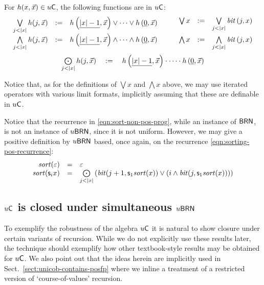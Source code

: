 \documentclass{lmcs}
\begin{document}
\begin{remark}
	\label{rmk:iter-fns}
For 
	$h(x,\vec x) \in u \mathsf{C}$, the following functions are in $u \mathsf{C}$:
	\[
	\begin{array}{c}
	\begin{array}{rcl}
	\bigvee\limits_{j <|x|} h(j,\vec x) & \dfn & h\left( \unary{|x|-1}, \vec x \right)  \vee \cdots \vee h\left(\unary{0}, \vec x\right) \\
	\bigwedge\limits_{j<|x|} h(j,\vec x) & \dfn & h\left( \unary{|x|-1}, \vec x \right)  \wedge \cdots \wedge h\left(\unary{0}, \vec x\right) 
	\end{array}
	\qquad
	\begin{array}{rcl}
	\bigvee x & \dfn & \bigvee\limits_{j < |x|} \bit\left( j, x\right) \\
	\noalign{\medskip}
	\bigwedge x & \dfn & \bigwedge\limits_{j < |x|} \bit\left( j, x\right)
	\end{array}
\\
\noalign{\medskip}
	\bigodot\limits_{j <|x|} h(j,\vec x) \quad  \dfn  \quad h\left( \unary{|x|-1}, \vec x \right)  \cdot \cdots \cdot h\left(\unary{0}, \vec x\right)
	\end{array}
	\]
	
	
	\noindent
	Notice that, as for the definitions of $\bigvee x$ and $\bigwedge x$ above, we may use iterated operators with various limit formats, implicitly assuming that these are definable in $u \mathsf{C}$.
\end{remark}

\begin{example}
	Notice that the recurrence in \eqref{eqn:sort-non-pos-prog}, while an instance of $\mathsf{BRN}$, is not an instance of $u\mathsf{BRN}$, since it is not uniform. 
	However, we may give a positive definition by $u\mathsf{BRN}$ based, once again, on the recurrence \eqref{eqn:sorting-pos-recurrence}:
	\[
	\begin{array}{rcl}
	\mathit{sort}(\varepsilon) & = & \varepsilon \\
	\mathit{sort}(\mathsf s_{i} x) & = & \mathop{\bigodot}\limits_{j < |x|} \left( \mathit{bit} ( j+1 , \mathsf s_{1} \mathit{sort} (x) ) \vee (i \wedge \mathit{bit} ({j} , \mathsf s_{1}  \mathit{sort} (x)))\right)
	\end{array}
	\]
\end{example}


\subsection{$u \mathsf{C}$ is closed under simultaneous $u\mathsf{BRN}$}
To exemplify the robustness of the algebra $u \mathsf{C}$ it is natural to show closure under certain variants of recursion. 
While we do not explicitly use these results later, the technique should exemplify how other textbook-style results may be obtained for $u \mathsf{C}$. We also point out that the ideas herein are implicitly used in Sect.~\ref{sect:unicob-contains-posfp} where we inline a treatment of a restricted version of `course-of-values' recursion.
\end{document}
